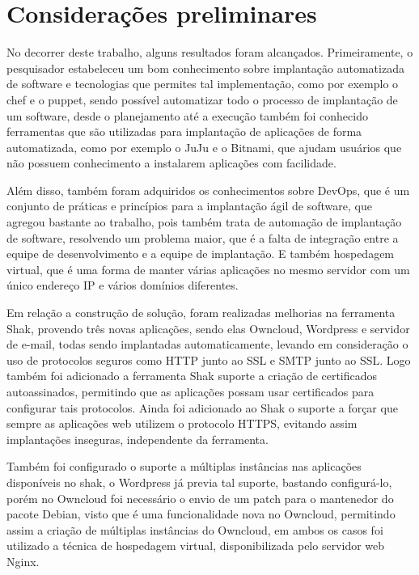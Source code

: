 \chapter{Considerações preliminares}
\label{cap-conclusoes}

No decorrer deste trabalho, alguns resultados foram alcançados. Primeiramente, o
pesquisador estabeleceu um bom conhecimento sobre implantação automatizada
de software e tecnologias que permites tal implementação, como por exemplo o chef
e o puppet, sendo possível automatizar todo o processo de implantação de um software,
desde o planejamento até a execução também foi conhecido ferramentas que são
utilizadas para implantação de aplicações de forma automatizada, como por exemplo
o JuJu e o Bitnami, que ajudam usuários que não possuem conhecimento a
instalarem aplicações com facilidade.

Além disso, também foram adquiridos os conhecimentos sobre DevOps, que é um conjunto
de práticas e princípios para a implantação ágil de software, que agregou bastante
ao trabalho, pois também trata de automação de implantação de software, resolvendo
um problema maior, que é a falta de integração entre a equipe de desenvolvimento
e a equipe de implantação. E também hospedagem virtual, que é uma forma de manter
várias aplicações no mesmo servidor com um único endereço IP e vários domínios diferentes.

Em relação a construção de solução, foram realizadas melhorias na ferramenta Shak,
provendo três novas aplicações, sendo elas Owncloud, Wordpress e servidor de e-mail,
todas sendo implantadas automaticamente, levando em consideração o uso de protocolos
seguros como HTTP junto ao SSL e SMTP junto ao SSL. Logo também foi adicionado a
ferramenta Shak suporte a criação de certificados autoassinados, permitindo que
as aplicações possam usar certificados para configurar tais protocolos. Ainda foi
adicionado ao Shak o suporte a forçar que sempre as aplicações web utilizem
o protocolo HTTPS, evitando assim implantações inseguras, independente da ferramenta.

Também foi configurado o suporte a múltiplas instâncias nas aplicações disponíveis
no shak, o Wordpress já previa tal suporte, bastando configurá-lo, porém no Owncloud
foi necessário o envio de um patch para o mantenedor do pacote Debian, visto que
é uma funcionalidade nova no Owncloud, permitindo assim a criação de múltiplas
instâncias do Owncloud, em ambos os casos foi utilizado a técnica de hospedagem
virtual, disponibilizada pelo servidor web Nginx.

